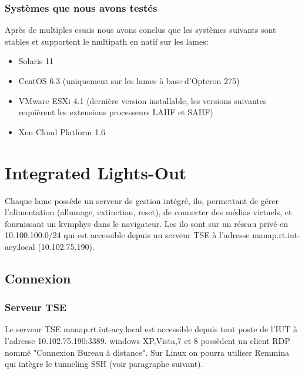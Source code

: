 \documentclass[a4paper,oneside]{report}
\begin{document}
\subsubsection{Systèmes que nous avons testés}
Après de multiples essais nous avons conclus que les systèmes suivants sont stables et supportent le multipath en natif sur les lames:
\begin{itemize}
\item Solaris 11
\item CentOS 6.3 (uniquement sur les lames à base d'Opteron 275)
\item VMware ESXi 4.1 (dernière version installable, les versions suivantes requièrent les extensions processeurs LAHF et SAHF)
\item Xen Cloud Platform 1.6
\end{itemize}

\section{Integrated Lights-Out}
Chaque lame possède un serveur de gestion intégré, \gls{ilo}, permettant de gérer l'alimentation (allumage, extinction, reset), de connecter des médias virtuels, et fournissant un \gls{kvmphys} dans le navigateur.
Les \gls{ilo} sont sur un réseau privé en 10.100.100.0/24 qui est accessible depuis un serveur TSE à l'adresse manap.rt.iut-acy.local (10.102.75.190).

\subsection{Connexion}
\subsubsection{Serveur TSE}
Le serveur TSE manap.rt.iut-acy.local est accessible depuis tout poste de l'IUT à l'adresse 10.102.75.190:3389. \gls{windows} XP,Vista,7 et 8 possèdent un client RDP nommé "Connexion Bureau à distance". Sur Linux on pourra utiliser Remmina qui intègre le tunneling SSH (voir paragraphe suivant).
\end{document}
